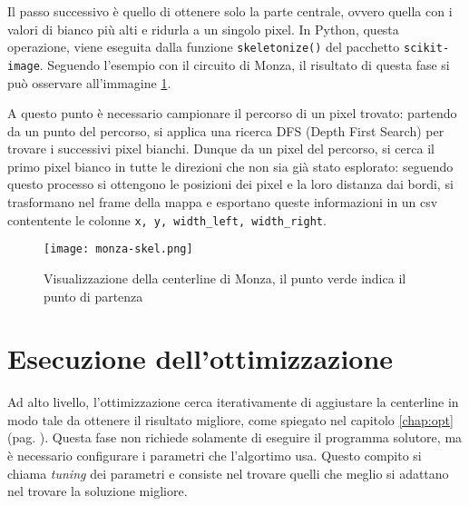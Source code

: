 Il passo successivo è quello di ottenere solo la parte centrale, ovvero quella con i valori di bianco
più alti e ridurla a un singolo pixel. In Python, questa operazione, viene eseguita dalla funzione
\verb|skeletonize()| del pacchetto \verb|scikit-image|. Seguendo l'esempio con il circuito di Monza, il
risultato di questa fase si può osservare all'immagine \ref{fig:monza-skel}.

A questo punto è necessario campionare il percorso di un pixel trovato: partendo da un punto del
percorso, si applica una ricerca DFS (Depth First Search) per trovare i successivi pixel bianchi. Dunque
da un pixel del percorso, si cerca il primo pixel bianco in tutte le direzioni che non sia già stato
esplorato: seguendo questo processo si ottengono le posizioni dei pixel e la loro distanza dai bordi, si
trasformano nel frame della mappa e esportano queste informazioni in un csv contentente le colonne
\verb|x, y, width_left, width_right|.
\vfill
\begin{figure}[h]
	\begin{center}
		\texttt{[image: monza-skel.png]}
	\end{center}
	\caption{Visualizzazione della centerline di Monza, il punto verde indica il punto di partenza}\label{fig:monza-skel}
\end{figure}

\newpage


\section{Esecuzione dell'ottimizzazione}
Ad alto livello, l'ottimizzazione cerca iterativamente di aggiustare la centerline in modo tale da
ottenere il risultato migliore, come spiegato nel capitolo \ref{chap:opt} (pag. \pageref{chap:opt}).
Questa fase non richiede solamente di eseguire il programma solutore, ma è necessario
configurare i parametri che l'algortimo usa. Questo compito si chiama \textit{tuning} dei parametri
e consiste nel trovare quelli che meglio si adattano nel trovare la soluzione migliore.

